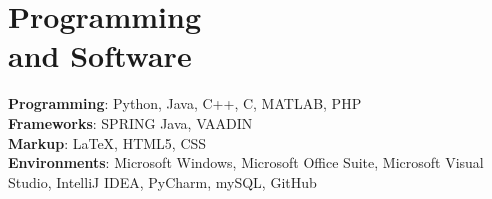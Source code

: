 \section{\sc Programming\\ and Software}
\textbf{Programming}: Python, Java, C++, C, MATLAB, PHP\\
\textbf{Frameworks}: SPRING Java, VAADIN\\
\textbf{Markup}: \LaTeX, HTML5, CSS\\
\textbf{Environments}: Microsoft Windows, Microsoft Office Suite, 
Microsoft Visual Studio, IntelliJ IDEA, PyCharm, mySQL, GitHub